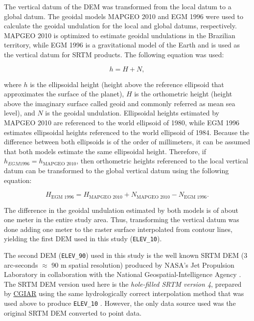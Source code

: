 The vertical datum of the DEM was transformed from the local datum to a global datum. The geoidal models MAPGEO 2010 \cite{IBGE2010a} and EGM 1996 \cite{LemoineEtAl1998} were used to calculate the geoidal undulation for the local and global datums, respectively. MAPGEO 2010 is optimized to estimate geoidal undulations in the Brazilian territory, while EGM 1996 is a gravitational model of the Earth and is used as the vertical datum for SRTM products. The following equation was used:

\begin{center}
  \label{eq:geoidal}
  \begin{equation}
    h = H + N,
  \end{equation}
\end{center}

\noindent where $h$ is the ellipsoidal height (height above the reference ellipsoid that approximates the surface of the planet), $H$ is the orthometric height (height above the imaginary surface called geoid and commonly referred as mean sea level), and $N$ is the geoidal undulation. Ellipsoidal heights estimated by MAPGEO 2010 are referenced to the world ellipsoid of 1980, while EGM 1996 estimates ellipsoidal heights referenced to the world ellipsoid of 1984. Because the difference between both ellipsoids is of the order of millimeters, it can be assumed that both models estimate the same ellipsoidal height. Therefore, if $h_{EGM 1996} = h_{\text{MAPGEO 2010}}$, then orthometric heights referenced to the local vertical datum can be transformed to the global vertical datum using the following equation:

\begin{center}
  \begin{equation}
    H_{\text{EGM 1996}} = H_{\text{MAPGEO 2010}} + N_{\text{MAPGEO 2010}} - N_{\text{EGM 1996}}.
  \end{equation}
\end{center}

The difference in the geoidal undulation estimated by both models is of about one meter in the entire study area. Thus, transforming the vertical datum was done adding one meter to the raster surface interpolated from contour lines, yielding the first DEM used in this study (\texttt{ELEV\_10}).

The second DEM (\texttt{ELEV\_90}) used in this study is the well known SRTM DEM (3 arc-seconds $\approx$ 90 m spatial resolution) produced by NASA’s Jet Propulsion Laboratory in collaboration with the National Geospatial-Intelligence Agency \cite{RodriguezEtAl2006}. The SRTM DEM version used here is the \textit{hole-filled SRTM version 4}, prepared by \href{http://www.cgiar.org/}{CGIAR} using the same hydrologically correct interpolation method that was used above to produce \texttt{ELEV\_10} \cite{ReuterEtAl2007, JarvisEtAl2008}. However, the only data source used was the original SRTM DEM converted to point data.

